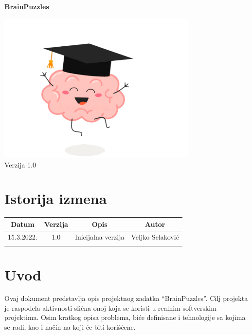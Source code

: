 \documentclass{article}
\date{}
\title{}
\begin{document}
\clearpage\maketitle
\thispagestyle{empty}
\providecommand{\inlinecode}[1]{\texttt{#1}}
\begin{center}
    \huge\textbf{BrainPuzzles}

    \hspace*{1cm}\includegraphics[width=10cm]{Resources/logo.png}\\
    \footnotesize Verzija 1.0

\end{center}
{\raggedleft\vfill{}\par
}
\newpage
\section*{Istorija izmena}
\vspace{1cm}
\begin{center}
\begin{tabular}{||c |c |c |c||} 
 \hline
 Datum & Verzija & Opis & Autor \\ [0.5ex] 
 \hline\hline
 15.3.2022. & 1.0 & Inicijalna verzija & Veljko Selaković \\ 
 \hline
 & & &\\
 \hline
\end{tabular}
\end{center}
\newpage
\tableofcontents

\newpage
\section{Uvod}
Ovaj dokument predstavlja opis projektnog zadatka “BrainPuzzles”. Cilj projekta je raspodela 
aktivnosti slična onoj koja se koristi u realnim softverskim projektima. Osim kratkog opisa problema, biće 
definisane i tehnologije sa kojima se radi, kao i način na koji će biti korišćene.
\end{document}
